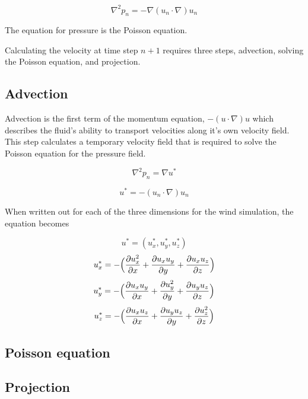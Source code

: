 $$ \nabla^2 p_n = - \nabla (u_n \cdot \nabla)u_n $$

The equation for pressure is the Poisson equation. 

Calculating the velocity at time step $n+1$ requires three steps, advection, 
solving the Poisson equation, and projection.

\subsection{Advection}

Advection is the first term of the momentum equation, $-(u \cdot \nabla)u$ which
describes the fluid's ability to transport velocities along it's own velocity 
field. This step calculates a temporary velocity field that is required to solve
the Poisson equation for the pressure field.

$$ \nabla^2 p_n = \nabla u^* $$

$$u^* = -(u_n \cdot \nabla)u_n$$

When written out for each of the three dimensions for the wind simulation, the
equation becomes

$$ u^* = (u^*_x, u^*_y, u^*_z) $$
$$ u^*_x = - \Big( \frac{\partial u_x^2}{\partial x} + \frac{\partial u_x u_y}{\partial y} + \frac{\partial u_x u_z}{\partial z}\Big) $$
$$ u^*_y = - \Big( \frac{\partial u_x u_y}{\partial x} + \frac{\partial u_y^2}{\partial y} + \frac{\partial u_y u_z}{\partial z}\Big) $$
$$ u^*_z = - \Big( \frac{\partial u_x u_z}{\partial x} + \frac{\partial u_y u_z}{\partial y} + \frac{\partial u_z^2}{\partial z}\Big) $$



\subsection{Poisson equation}

\subsection{Projection}

